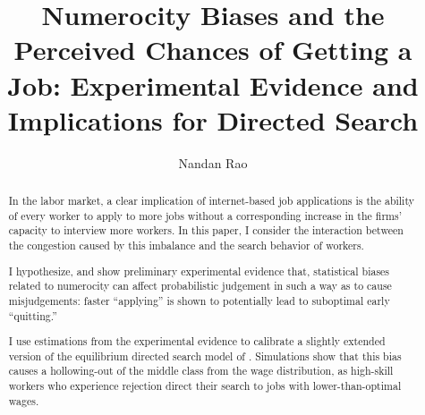 \documentclass[a4paper,12pt]{article}
\begin{document}
\title{ Numerocity Biases and the Perceived Chances of Getting a Job: Experimental Evidence and Implications for Directed Search }

\author{Nandan Rao}

\maketitle

\begin{abstract}

In the labor market, a clear implication of internet-based job applications is the ability of every worker to apply to more jobs without a corresponding increase in the firms' capacity to interview more workers. In this paper, I consider the interaction between the congestion caused by this imbalance and the search behavior of workers.

I hypothesize, and show preliminary experimental evidence that, statistical biases related to numerocity can affect probabilistic judgement in such a way as to cause misjudgements: faster ``applying'' is shown to potentially lead to suboptimal early ``quitting.''

I use estimations from the experimental evidence to calibrate a slightly extended version of the equilibrium directed search model of \cite{gonzalez2010}. Simulations show that this bias causes a hollowing-out of the middle class from the wage distribution, as high-skill workers who experience rejection direct their search to jobs with lower-than-optimal wages.

\end{abstract}
\end{document}
